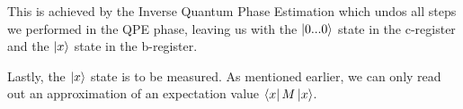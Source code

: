 This is achieved by the Inverse Quantum Phase Estimation which undos all steps we performed in the QPE phase, leaving us with the $\ket{0...0}$ state in the c-register and the $\ket x$ state in the b-register.

Lastly, the $\ket x$ state is to be measured. As mentioned earlier, we can only read out an approximation of an expectation value $\bra x M \ket x$.

